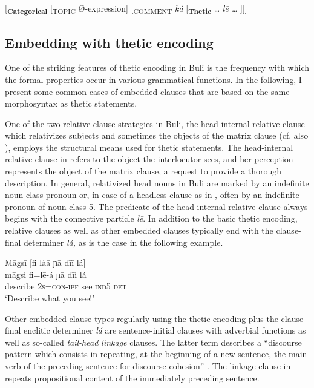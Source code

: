 \documentclass[output=paper]{langsci/langscibook}
\begin{document}
\ea\label{ex:schwarz:27} {}
[\textbf{\textsubscript{Categorical}}\textsubscript{} [\textsubscript{TOPIC} Ø-expression]\textsubscript{} [\textsubscript{COMMENT}\textit{ ká} [\textbf{\textsubscript{Thetic}} … \textit{l\={e} …} ]]]
\z

\subsection{Embedding with thetic encoding}\label{sec:schwarz:3.5}

One of the striking features of thetic encoding in Buli is the frequency with which the formal properties occur in various grammatical functions. In the following, I present some common cases of embedded clauses that are based on the same morphosyntax as thetic statements.

One of the two relative clause strategies in Buli, the head-internal relative clause which relativizes subjects and sometimes the objects of the matrix clause (cf. also \citealt{Hiraiwa2003}), employs the structural means used for thetic statements. The head-internal relative clause in  refers to the object the interlocutor sees, and her perception represents the object of the matrix clause, a request to provide a thorough description. In general, relativized head nouns in Buli are marked by an indefinite noun class pronoun or, in case of a headless clause as in , often by an indefinite pronoun of noun class 5. The predicate of the head-internal relative clause always begins with the connective particle \textit{l\={e}}. In addition to the basic thetic encoding, relative clauses as well as other embedded clauses typically end with the clause-final determiner \textit{lá,} as is the case in the following example.

\ea\label{ex:schwarz:28}
\glll   M\={a}gs\={i}    \textup{[}{fi là\={a}}     ɲ\={a}  d\={i}\={i}   lá\textup{]}\\
    \textup{m\={a}gsi}    fi=l\={e}-á     ɲ\={a}  {d\={i}i} {lá}\\
       describe    2\textsc{s}=\textsc{con}-\textsc{ipf}   see     \textsc{ind}5 \textsc{det}\\
\glt ‘Describe what you see!’
\z

Other embedded clause types regularly using the thetic encoding plus the clause-final enclitic determiner \textit{lá} are sentence-initial clauses with adverbial functions as well as so-called \textit{tail-head linkage} clauses. The latter term describes a “discourse pattern which consists in repeating, at the beginning of a new sentence, the main verb of the preceding sentence for discourse cohesion” \citep[109]{Guillaume2011}. The linkage clause in  repeats propositional content of the immediately preceding sentence. 
\end{document}
